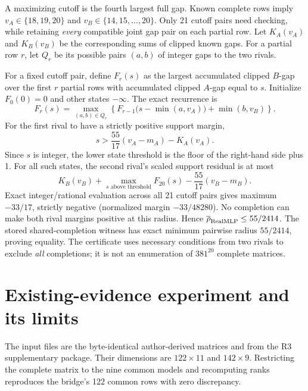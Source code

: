 \documentclass[11pt,a4paper]{article}
\newcommand{\rhi}{\overline{\rho}}
\begin{document}
A maximizing cutoff is the fourth largest full gap. Known complete rows imply
$v_A\in\{18,19,20\}$ and $v_B\in\{14,15,\ldots,20\}$. Only 21 cutoff pairs need
checking, while retaining \emph{every} compatible joint gap pair on each partial
row. Let $K_A(v_A)$ and $K_B(v_B)$ be the corresponding sums of clipped known
gaps. For a partial row $r$, let $Q_r$ be its possible pairs $(a,b)$ of integer
gaps to the two rivals.

For a fixed cutoff pair, define $F_r(s)$ as the largest accumulated clipped
$B$-gap over the first $r$ partial rows with accumulated clipped $A$-gap equal to
$s$. Initialize $F_0(0)=0$ and other states $-\infty$. The exact recurrence is
\begin{equation}
F_r(s)=\max_{(a,b)\in Q_r}\left\{
 F_{r-1}\bigl(s-\min(a,v_A)\bigr)+\min(b,v_B)\right\}.
\end{equation}
For the first rival to have a strictly positive support margin,
\begin{equation}
s> \frac{55}{17}(v_A-m_A)-K_A(v_A).
\end{equation}
Since $s$ is integer, the lower state threshold is the floor of the right-hand
side plus 1. For all such states, the second rival's scaled support residual is
at most
\begin{equation}
K_B(v_B)+\max_{s\text{ above threshold}}F_{20}(s)
-\frac{55}{17}(v_B-m_B).
\end{equation}
Exact integer/rational evaluation across all 21 cutoff pairs gives maximum
$-33/17$, strictly negative (normalized margin $-33/48280$). No completion can
make both rival margins positive at this radius. Hence $\rhi_{\rm RealMLP}\leq
55/2414$. The stored shared-completion witness has exact minimum pairwise
radius $55/2414$, proving equality. The certificate uses necessary conditions
from two rivals to exclude \emph{all} completions; it is not an enumeration of
$381^{20}$ complete matrices.

\newpage
\section{Existing-evidence experiment and its limits}
The input files are the byte-identical author-derived matrices
 and
from the R3 supplementary package. Their dimensions are $122\times11$ and
$142\times9$. Restricting the complete matrix to the nine common models and
recomputing ranks reproduces the bridge's 122 common rows with zero discrepancy.
\end{document}
